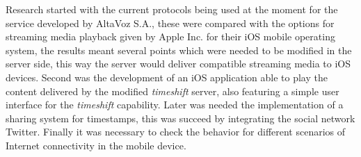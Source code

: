  


Research started with the current protocols being used at the moment for the service developed by AltaVoz S.A., these were compared with the options for streaming media playback given by Apple Inc. for their iOS mobile operating system, the results meant several points which were needed to be modified in the server side, this way the server would deliver compatible streaming media to iOS devices. Second was the development of an iOS application able to play the content delivered by the modified \textit{timeshift} server, also featuring a simple user interface for the \textit{timeshift} capability.
Later was needed the implementation of a sharing system for timestamps, this was succeed by integrating the social network Twitter. Finally it was necessary to check the behavior for different scenarios of Internet connectivity in the mobile device. 
\\


